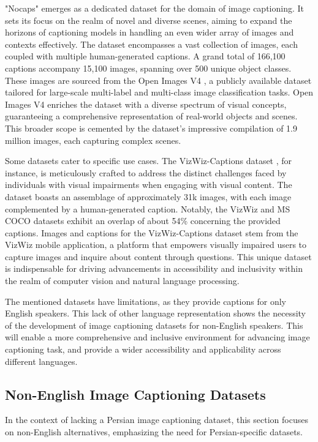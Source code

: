 \documentclass[lettersize,journal]{IEEEtran}
\begin{document}
"Nocaps" \cite{Nocaps} emerges as a dedicated dataset for the domain of image captioning. It sets its focus on the realm of novel and diverse scenes, aiming to expand the horizons of captioning models in handling an even wider array of images and contexts effectively. The dataset encompasses a vast collection of images, each coupled with multiple human-generated captions. A grand total of 166,100 captions accompany 15,100 images, spanning over 500 unique object classes. These images are sourced from the Open Images V4 \cite{Openimages}, a publicly available dataset tailored for large-scale multi-label and multi-class image classification tasks. Open Images V4 enriches the dataset with a diverse spectrum of visual concepts, guaranteeing a comprehensive representation of real-world objects and scenes. This broader scope is cemented by the dataset's impressive compilation of 1.9 million images, each capturing complex scenes.

Some datasets cater to specific use cases. The VizWiz-Captions dataset \cite{VizWiz}, for instance, is meticulously crafted to address the distinct challenges faced by individuals with visual impairments when engaging with visual content. The dataset boasts an assemblage of approximately 31k images, with each image complemented by a human-generated caption. Notably, the VizWiz and MS COCO datasets exhibit an overlap of about 54\% concerning the provided captions. Images and captions for the VizWiz-Captions dataset stem from the VizWiz mobile application, a platform that empowers visually impaired users to capture images and inquire about content through questions. This unique dataset is indispensable for driving advancements in accessibility and inclusivity within the realm of computer vision and natural language processing.

The mentioned datasets have limitations, as they provide captions for only English speakers. This lack of other language representation shows the necessity of the development of image captioning datasets for non-English speakers. This will enable a more comprehensive and inclusive environment for advancing image captioning task, and provide a wider accessibility and applicability across different languages.

\subsection{Non-English Image Captioning Datasets}
In the context of lacking a Persian image captioning dataset, this section focuses on non-English alternatives, emphasizing the need for Persian-specific datasets.
\end{document}
